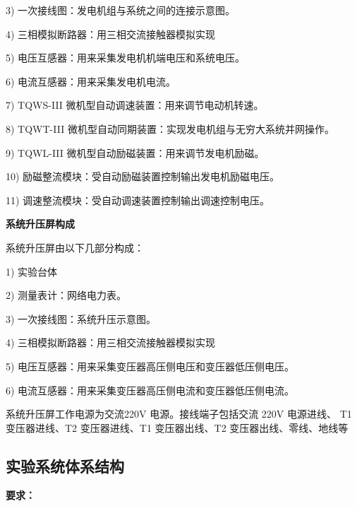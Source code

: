 \documentclass[a4paper]{ctexrep}
\begin{document}
                    3) 一次接线图：发电机组与系统之间的连接示意图。 
                    
                    4) 三相模拟断路器：用三相交流接触器模拟实现 
                    
                    5) 电压互感器：用来采集发电机机端电压和系统电压。 
                    
                    6) 电流互感器：用来采集发电机电流。 
                    
                    7) TQWS-III 微机型自动调速装置：用来调节电动机转速。
                    
                    8) TQWT-III 微机型自动同期装置：实现发电机组与无穷大系统并网操作。 
                    
                    9) TQWL-III 微机型自动励磁装置：用来调节发电机励磁。 
                    
                    10) 励磁整流模块：受自动励磁装置控制输出发电机励磁电压。 
                    
                    11) 调速整流模块：受自动调速装置控制输出调速控制电压。

                    \textbf{系统升压屏构成}
                    
                    系统升压屏由以下几部分构成： 
                   
                    1) 实验台体 
                   
                    2) 测量表计：网络电力表。 
                    
                    3) 一次接线图：系统升压示意图。 
                    
                    4) 三相模拟断路器：用三相交流接触器模拟实现 
                    
                    5) 电压互感器：用来采集变压器高压侧电压和变压器低压侧电压。 
                    
                    6) 电流互感器：用来采集变压器高压侧电流和变压器低压侧电流。
                    
                    系统升压屏工作电源为交流220V 电源。接线端子包括交流 220V 电源进线、 T1 变压器进线、T2 变压器进线、T1 变压器出线、T2 变压器出线、零线、地线等

                \subsection{实验系统体系结构}
                    \textbf{要求： }
                    
\end{document}
